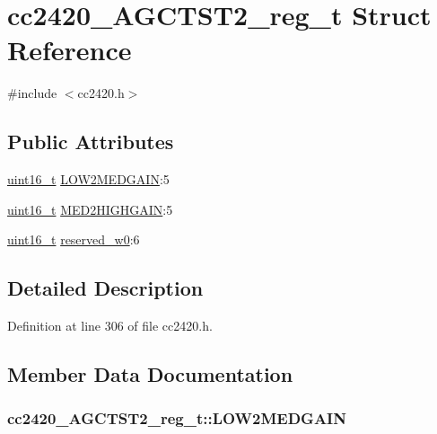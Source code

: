 \hypertarget{structcc2420___a_g_c_t_s_t2__reg__t}{}\section{cc2420\+\_\+\+A\+G\+C\+T\+S\+T2\+\_\+reg\+\_\+t Struct Reference}
\label{structcc2420___a_g_c_t_s_t2__reg__t}


{\ttfamily \#include $<$cc2420.\+h$>$}

\subsection*{Public Attributes}
\begin{DoxyCompactItemize}
\item 
\hyperlink{_p_e___types_8h_a1f1825b69244eb3ad2c7165ddc99c956}{uint16\+\_\+t} \hyperlink{structcc2420___a_g_c_t_s_t2__reg__t_a509161ecc591ab5daeac2ea75b82356e}{L\+O\+W2\+M\+E\+D\+G\+A\+IN}\+:5
\item 
\hyperlink{_p_e___types_8h_a1f1825b69244eb3ad2c7165ddc99c956}{uint16\+\_\+t} \hyperlink{structcc2420___a_g_c_t_s_t2__reg__t_adca6411a9ee9c550c70f6138086dd000}{M\+E\+D2\+H\+I\+G\+H\+G\+A\+IN}\+:5
\item 
\hyperlink{_p_e___types_8h_a1f1825b69244eb3ad2c7165ddc99c956}{uint16\+\_\+t} \hyperlink{structcc2420___a_g_c_t_s_t2__reg__t_ada7c03524b1bc1c686001369fcea9b25}{reserved\+\_\+w0}\+:6
\end{DoxyCompactItemize}


\subsection{Detailed Description}


Definition at line 306 of file cc2420.\+h.



\subsection{Member Data Documentation}
\subsubsection[{\texorpdfstring{L\+O\+W2\+M\+E\+D\+G\+A\+IN}{LOW2MEDGAIN}}]{ cc2420\+\_\+\+A\+G\+C\+T\+S\+T2\+\_\+reg\+\_\+t\+::\+L\+O\+W2\+M\+E\+D\+G\+A\+IN}\hypertarget{structcc2420___a_g_c_t_s_t2__reg__t_a509161ecc591ab5daeac2ea75b82356e}{}\label{structcc2420___a_g_c_t_s_t2__reg__t_a509161ecc591ab5daeac2ea75b82356e}


